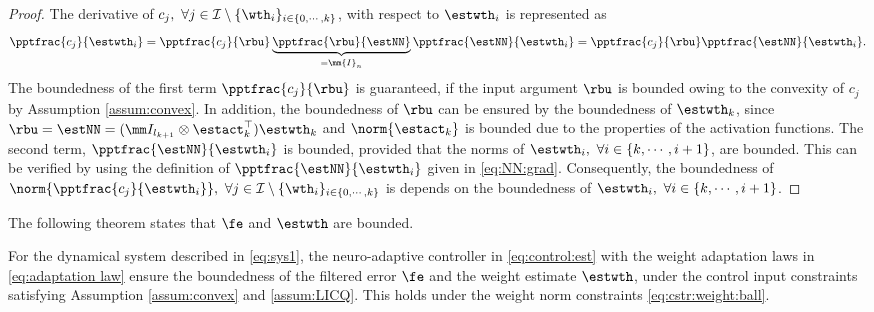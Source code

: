 \documentclass[journal]{IEEEtran}
\begin{document}
\begin{proof}

The derivative of $c_j,\ \forall j\in\mathcal I \setminus \{\wth_i\}_{i\in\{0,\cdots,k\}}$, with respect to $\estwth_i$ is represented as
\begin{equation}
    \pptfrac{c_j}{\estwth_i} 
    = 
    \pptfrac{c_j}{\rbu} 
    \underbrace{
        \pptfrac{\rbu}{\estNN} 
    }_{=\mm{I}_n}
    \pptfrac{\estNN}{\estwth_i}
    = 
    \pptfrac{c_j}{\rbu} 
    \pptfrac{\estNN}{\estwth_i}
    .
\end{equation}
The boundedness of the first term $\pptfrac{c_j}{\rbu}$ is guaranteed, if the input argument $\rbu$ is bounded owing to the convexity of $c_j$ by Assumption \ref{assum:convex}.
In addition, the boundedness of $\rbu$ can be ensured by the boundedness of $\estwth_k$, since $\rbu=\estNN=(\mm I_{l_{k+1}}\otimes \estact_k^\top)\estwth_k$ and $\norm{\estact_k}$ is bounded due to the properties of the activation functions.
The second term, $\pptfrac{\estNN}{\estwth_i}$ is bounded, provided that the norms of $\estwth_i,\ \forall i \in\{k,\cdots,i+1\}$, are bounded. 
This can be verified by using the definition of $\pptfrac{\estNN}{\estwth_i}$ given in \eqref{eq:NN:grad}.
Consequently, the boundedness of $\norm{\pptfrac{c_j}{\estwth_i}},\ \forall j\in\mathcal I \setminus \{\wth_i\}_{i\in\{0,\cdots,k\}}$ is depends on the boundedness of $\estwth_i,\ \forall i\in \{k,\cdots,i+1\}$.

\end{proof}

The following theorem states that $\fe$ and $\estwth$ are bounded.

\begin{theorem}
    For the dynamical system described in \eqref{eq:sys1}, the neuro-adaptive controller in \eqref{eq:control:est} with the weight adaptation laws in \eqref{eq:adaptation law} ensure the boundedness of the filtered error $\fe$ and the weight estimate $\estwth$, under the control input constraints satisfying Assumption \ref{assum:convex} and \ref{assum:LICQ}.
    This holds under the weight norm constraints \eqref{eq:cstr:weight:ball}.
\end{theorem}
\end{document}

